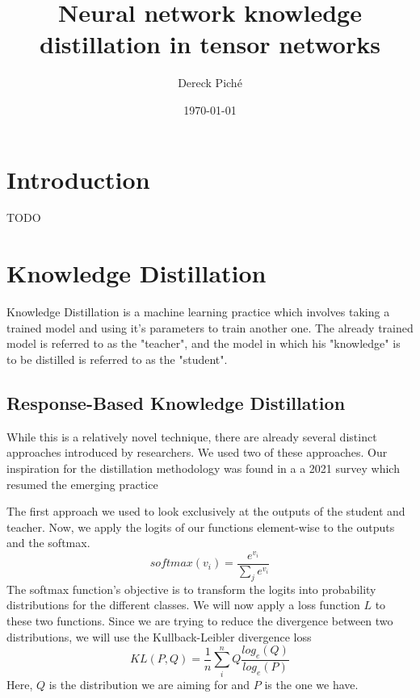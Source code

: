 \documentclass[11pt]{article}
\title{Neural network knowledge distillation in tensor networks}
\author{Dereck Piché}
\date{\today}
\theoremstyle{definition}
\theoremstyle{definition}
\begin{document}
\maketitle

\begin{abstract}
\end{abstract}

\section{Introduction}
TODO


\section{Knowledge Distillation}
Knowledge Distillation is a machine learning practice which involves
taking a trained model and using it's parameters to train another one.
The already trained model is referred to as the "teacher", and 
the model in which his "knowledge" is to be distilled is referred to as
the "student".

\subsection{Response-Based Knowledge Distillation}
While this is a relatively novel technique, there are 
already several distinct approaches introduced by researchers.
We used two of these approaches. Our inspiration for the distillation 
methodology was found in a a 2021 survey which resumed the emerging practice \textcite{Gou_2021}


The first approach we used to look exclusively at the outputs
of the student and teacher. Now, we apply the logits
of our functions element-wise to the outputs and the softmax.
\begin{equation}
    softmax(v_i) = \frac{e^{v_i}}{\sum_{j}{e^{v_i}}}
\end{equation}
The softmax function's objective is to transform the logits
into probability distributions for the different classes.
We will now apply a loss function $L$ to these two functions.
Since we are trying to reduce the divergence between 
two distributions, we will use the Kullback-Leibler divergence loss
\begin{equation}
    KL(P, Q) = \frac{1}{n} \sum_i^n Q \frac{log_e(Q)}{log_e(P)}
\end{equation}
Here, $Q$ is the distribution we are aiming for and $P$ is the one we have.
\end{document}
